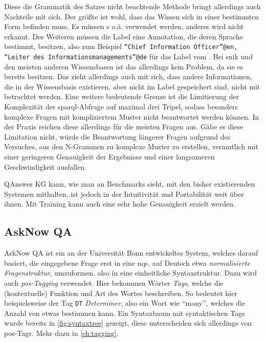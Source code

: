Diese die Grammatik des Satzes nicht beachtende Methode bringt allerdings auch Nachteile mit sich.
Der größte ist wohl, dass das Wissen sich in einer bestimmten Form befinden muss.
Es müssen s o.ä. verwendet werden, anderes wird nicht erkannt.
Des Weiteren müssen die Label eine Annotation, die deren Sprache bestimmt, besitzen, also zum Beispiel \texttt{\enquote{Chief Information Officer}@en, \enquote{Leiter des Informationsmanagements}@de}
für das Label vom .
Bei \ac{snik} und den meisten anderen Wissensbasen ist das allerdings kein Problem, da sie es bereits besitzen.
Das zieht allerdings auch mit sich, dass andere Informationen, die in der Wissensbasis existieren, aber nicht im Label gespeichert sind, nicht mit betrachtet werden.
Eine weitere bedeutende Grenze ist die Limitierung der Komplexität der \ac{sparql}-Abfrage auf maximal drei Tripel, sodass besonders komplexe Fragen mit kompliziertem Muster nicht beantwortet werden können.
In der Praxis reichen diese allerdings für die meisten Fragen aus.
Gäbe es diese Limitation nicht, würde die Beantwortung längerer Fragen aufgrund des Versuches, aus den N-Grammen zu komplexe Muster zu erstellen,
vermutlich mit einer geringeren Genauigkeit der Ergebnisse und einer langsameren Geschwindigkeit ausfallen.

QAnswer KG kann, wie man an Benchmarks sieht, mit den bisher existierenden Systemen mithalten, ist jedoch in der Intuitivität und Portabilität weit über ihnen.
Mit Training kann auch eine sehr hohe Genauigkeit erzielt werden.

\subsection{AskNow QA}

AskNow QA \citep{asknow} ist ein an der Universität Bonn entwickeltes System, welches darauf basiert,
die eingegebene Frage erst in eine \ac{nqs}, auf Deutsch etwa \emph{normalisierte Fragenstruktur}, umzuformen, also in eine einheitliche Syntaxstruktur.
Dazu wird auch \emph{\ac{pos}-Tagging} verwendet.
Hier bekommen Wörter \emph{Tags}, welche die (kontextuelle) Funktion und Art des Wortes beschreiben.
So bedeutet hier beispielsweise der Tag \texttt{DT} \emph{Determiner}, also ein Wort wie \enquote{many}, welches die Anzahl von etwas bestimmen kann.
Ein Syntaxbaum mit syntaktischen Tags wurde bereits in \cref{fig:syntaxtree} gezeigt, diese unterscheiden sich allerdings von \ac{pos}-Tags.
Mehr dazu in \cref{ch:tagging}.

